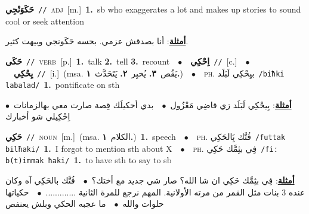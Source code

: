 \documentclass[10pt,a4paper,twoside]{article} %
\begin{document}
\begin{multicols}{2}
{\setlength\topsep{0pt}\textbf{\foreignlanguage{arabic}{حَكَوَنْجِي}}\ {\color{gray}\texttt{//}\color{black}}\ \textsc{adj}\ [m.]\ \textbf{1.}~sb who exaggerates a lot and makes up stories to sound cool or seek attention\  \begin{flushright}\color{gray}\foreignlanguage{arabic}{\textbf{\underline{\foreignlanguage{arabic}{أمثلة}}}: أنا بصدقش عزمي. بحسه حَكَونجي وبيهت كثير.}\end{flushright}\color{black}} \vspace{2mm}

{\setlength\topsep{0pt}\textbf{\foreignlanguage{arabic}{حَكَى}}\ {\color{gray}\texttt{//}\color{black}}\ \textsc{verb}\ [p.]\ \textbf{1.}~talk  \textbf{2.}~tell  \textbf{3.}~recount\ \ $\bullet$\ \ \setlength\topsep{0pt}\textbf{\foreignlanguage{arabic}{اِحْكِي}}\ {\color{gray}\texttt{//}\color{black}}\ [c.]\ \ $\bullet$\ \ \setlength\topsep{0pt}\textbf{\foreignlanguage{arabic}{يِحْكِي}}\ {\color{gray}\texttt{//}\color{black}}\ [i.]\ \color{gray}(msa. \foreignlanguage{arabic}{يَقُص}~\foreignlanguage{arabic}{\textbf{٣.}}  \foreignlanguage{arabic}{يُخبِر}~\foreignlanguage{arabic}{\textbf{٢.}}  \foreignlanguage{arabic}{يَتَحَدَّث}~\foreignlanguage{arabic}{\textbf{١.}})\color{black}\ \ $\bullet$\ \ \textsc{ph.} \color{gray} \foreignlanguage{arabic}{بيِحْكِي لَبَلَد}\color{black}\ {\color{gray}\texttt{/{\sffamily biħki labalad}/}\color{black}}\ \textbf{1.}~pontificate on sth\  \begin{flushright}\color{gray}\foreignlanguage{arabic}{\textbf{\underline{\foreignlanguage{arabic}{أمثلة}}}: بِيحْكِي لَبَلَد زي قاضِي مَعْزُول\ $\bullet$\ \  بدي أحكيلَك قِصة صارت معي بهالزمانات\ $\bullet$\ \  اِحْكِيلي شو أخبارك}\end{flushright}\color{black}} \vspace{2mm}

{\setlength\topsep{0pt}\textbf{\foreignlanguage{arabic}{حَكِي}}\ {\color{gray}\texttt{//}\color{black}}\ \textsc{noun}\ [m.]\ \color{gray}(msa. \foreignlanguage{arabic}{الكلام}~\foreignlanguage{arabic}{\textbf{١.}})\color{black}\ \textbf{1.}~speech\ \ $\bullet$\ \ \textsc{ph.} \color{gray} \foreignlanguage{arabic}{فُتَّك بَِالحَكِي}\color{black}\ {\color{gray}\texttt{/{\sffamily futtak bilħaki}/}\color{black}}\ \textbf{1.}~I forgot to mention sth about X\ \ $\bullet$\ \ \textsc{ph.} \color{gray} \foreignlanguage{arabic}{فِي بثِمَّك حَكِي}\color{black}\ {\color{gray}\texttt{/{\sffamily fiː b(t)immak ħaki}/}\color{black}}\ \textbf{1.}~to have sth to say to sb\  \begin{flushright}\color{gray}\foreignlanguage{arabic}{\textbf{\underline{\foreignlanguage{arabic}{أمثلة}}}: فِي بثِمَّك حَكِي ان شا الله؟ صار شي جديد مع أختك؟\ $\bullet$\ \  فُتَّك بالحَكِي آه وكان عنده 3 بنات مثل القمر من مرته الأولانية. المهم نرجع للمرة الثانية .............\ $\bullet$\ \  حكياتها حلوات والله\ $\bullet$\ \  ما عجبه الحكي وبلش يعنفص}\end{flushright}\color{black}} \vspace{2mm}


\end{multicols}
\end{document}
